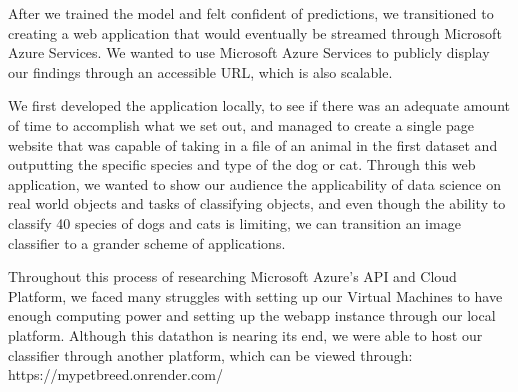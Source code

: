 \documentclass[11pt]{article}
\begin{document}
After we trained the model and felt confident of predictions, we
transitioned to creating a web application that would eventually be
streamed through Microsoft Azure Services. We wanted to use Microsoft
Azure Services to publicly display our findings through an accessible
URL, which is also scalable.

We first developed the application locally, to see if there was an
adequate amount of time to accomplish what we set out, and managed to
create a single page website that was capable of taking in a file of an
animal in the first dataset and outputting the specific species and type
of the dog or cat. Through this web application, we wanted to show our
audience the applicability of data science on real world objects and
tasks of classifying objects, and even though the ability to classify 40
species of dogs and cats is limiting, we can transition an image
classifier to a grander scheme of applications.

Throughout this process of researching Microsoft Azure's API and Cloud
Platform, we faced many struggles with setting up our Virtual Machines
to have enough computing power and setting up the webapp instance
through our local platform. Although this datathon is nearing its end,
we were able to host our classifier through another platform, which can
be viewed through: https://mypetbreed.onrender.com/


    
    
    
    
\end{document}
